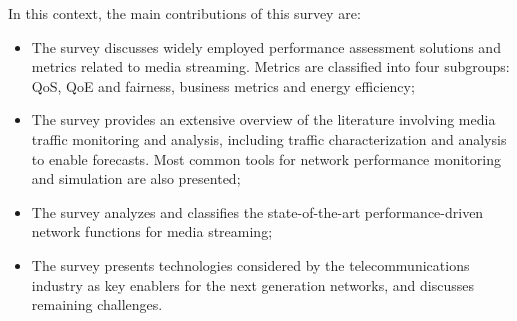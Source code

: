 	
In this context, the main contributions of this survey are:
\begin{itemize}
	\item The survey discusses widely employed performance assessment solutions and metrics related to media streaming. Metrics are classified into four subgroups: QoS, QoE and fairness, business metrics and energy efficiency;
	\item The survey provides an extensive overview of the literature involving media traffic monitoring and analysis, including traffic characterization and analysis to enable forecasts. Most common tools for network performance monitoring and simulation are also presented;
	\item The survey analyzes and classifies the \hbox{state-of-the-art} performance-driven network functions for media streaming;
	\item The survey presents technologies considered by the telecommunications industry as key enablers for the next generation networks, and discusses remaining challenges.
\end{itemize}

